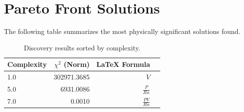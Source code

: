 \documentclass{article}
\begin{document}
\section{Pareto Front Solutions}
The following table summarizes the most physically significant solutions found.

\begin{table}[h!]
\centering
\begin{tabular}{lrrp{8cm}}
\toprule
\textbf{Complexity} & \textbf{$\chi^2$ (Norm)} & \textbf{LaTeX Formula} \\
\midrule
1.0 & 302971.3685 & $V$ \\
5.0 & 6931.0086 & $\frac{P}{R n}$ \\
7.0 & 0.0010 & $\frac{P V}{R n}$ \\
\bottomrule
\end{tabular}
\caption{Discovery results sorted by complexity.}
\end{table}
\end{document}

